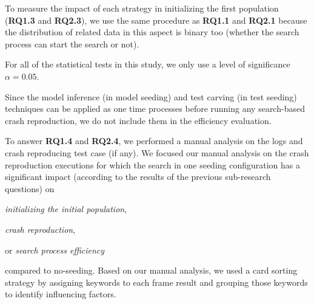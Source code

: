 To measure the impact of each strategy in initializing the first population (\textbf{RQ1.3} and \textbf{RQ2.3}), we use the same procedure as \textbf{RQ1.1} and \textbf{RQ2.1} because the distribution of related data in this aspect is binary too (\ie whether the search process can start the search or not).

For all of the statistical tests in this study, we only use a level of significance $\alpha = 0.05$.

Since the model inference (in model seeding) and test carving (in test seeding) techniques can be applied as one time processes before running any search-based crash reproduction, we do not include them in the efficiency evaluation.

To answer \textbf{RQ1.4} and \textbf{RQ2.4}, we performed a manual analysis on the logs and crash reproducing test case (if any). We focused our manual analysis on the crash reproduction executions for which the search in one seeding configuration has a significant  impact (according to the results of the previous sub-research questions) on 
\begin{inparaenum}[(i)]
\item \textit{initializing the initial population},
\item \textit{crash reproduction},
\item or \textit{search process efficiency}
\end{inparaenum}
 compared to no-seeding.
Based on our manual analysis, we used a card sorting strategy by assigning keywords to each frame result and grouping those keywords to identify influencing factors.